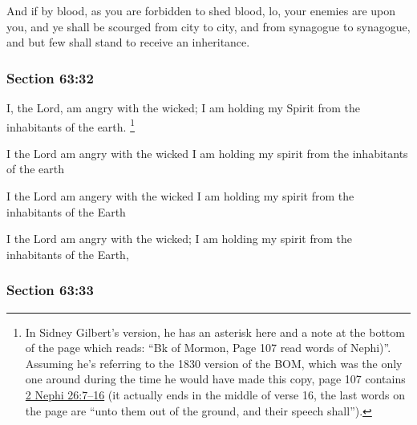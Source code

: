 		And if by blood, as you are forbidden to shed blood, lo, your enemies are upon you, and ye shall be scourged from city to city, and from synagogue to synagogue, and but few shall stand to receive an inheritance.


	\subsubsection{Section 63:32} %
		\label{DC63-32}

		I, the Lord, am angry with the wicked; I am holding my Spirit from the inhabitants of the earth.%
			\footnote{%
				In Sidney Gilbert's version, he has an asterisk here and a note at the bottom of the page which reads: ``Bk of Mormon, Page 107 read words of Nephi)''. Assuming he's referring to the 1830 version of the BOM, which was the only one around during the time he would have made this copy, page 107 contains \hyperref[2NEPHI-26-7]{2 Nephi 26:7--16} (it actually ends in the middle of verse 16, the last words on the page are ``unto them out of the ground, and their speech shall'').
				}

		\begin{framed}
		\scriptsize
			\begin{compactdesc}
				\item[JSP] I the Lord am angry with the wicked I am holding my spirit from the inhabitants of the earth
				\item[RB1] I the Lord am angery with the wicked I am holding my spirit from the inhabitants of the Earth
				\item[Gilbert] I the Lord am angry with the wicked; I am holding my spirit from the inhabitants of the Earth,
			\end{compactdesc}
		\end{framed}

	\subsubsection{Section 63:33} %
		\label{DC63-33}

